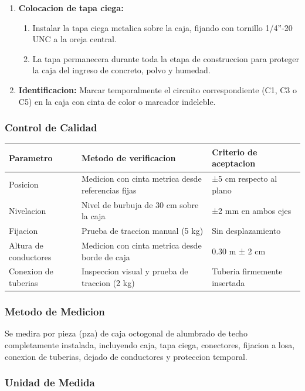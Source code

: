 \begin{enumerate}
  \item \textbf{Colocacion de tapa ciega:}
  \begin{enumerate}
    \item Instalar la tapa ciega metalica sobre la caja, fijando con tornillo 1/4''-20 UNC a la oreja central.
    \item La tapa permanecera durante toda la etapa de construccion para proteger la caja del ingreso de concreto, polvo y humedad.
  \end{enumerate}
  \item \textbf{Identificacion:} Marcar temporalmente el circuito correspondiente (C1, C3 o C5) en la caja con cinta de color o marcador indeleble.
\end{enumerate}

\subsubsection{Control de Calidad}

\begin{longtable}{L{4.5cm} L{4.5cm} L{4.5cm}}
\toprule
\textbf{Parametro} & \textbf{Metodo de verificacion} & \textbf{Criterio de aceptacion} \\
\midrule
Posicion & Medicion con cinta metrica desde referencias fijas & ±5 cm respecto al plano \\
Nivelacion & Nivel de burbuja de 30 cm sobre la caja & ±2 mm en ambos ejes \\
Fijacion & Prueba de traccion manual (5 kg) & Sin desplazamiento \\
Altura de conductores & Medicion con cinta metrica desde borde de caja & 0.30 m ± 2 cm \\
Conexion de tuberias & Inspeccion visual y prueba de traccion (2 kg) & Tuberia firmemente insertada \\
\bottomrule
\end{longtable}

\subsubsection{Metodo de Medicion}

Se medira por pieza (pza) de caja octogonal de alumbrado de techo completamente instalada, incluyendo caja, tapa ciega, conectores, fijacion a losa, conexion de tuberias, dejado de conductores y proteccion temporal.

\subsubsection{Unidad de Medida}

